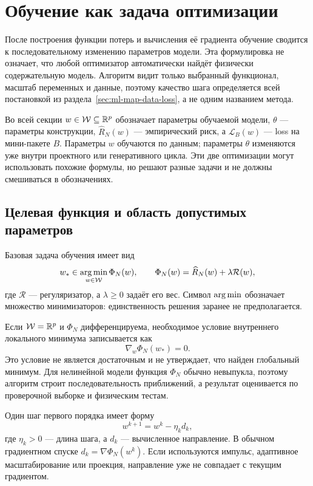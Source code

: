 \section{Обучение как задача оптимизации}
\label{sec:training-as-optimization}
После построения функции потерь и вычисления её градиента обучение сводится к последовательному изменению параметров модели. Эта формулировка не означает, что любой оптимизатор автоматически найдёт физически содержательную модель. Алгоритм видит только выбранный функционал, масштаб переменных и данные, поэтому качество шага определяется всей постановкой из раздела~\ref{sec:ml-map-data-loss}, а не одним названием метода.

Во всей секции $w\in\mathcal W\subseteq\mathbb{R}^p$ обозначает параметры обучаемой модели, $\theta$ --- параметры конструкции, $\widehat R_N(w)$ --- эмпирический риск, а $\mathcal L_B(w)$ --- loss на мини-пакете $B$. Параметры $w$ обучаются по данным; параметры $\theta$ изменяются уже внутри проектного или генеративного цикла. Эти две оптимизации могут использовать похожие формулы, но решают разные задачи и не должны смешиваться в обозначениях.

\subsection{Целевая функция и область допустимых параметров}
Базовая задача обучения имеет вид
\begin{equation}
 w_*
 \in
 \operatorname*{arg\,min}_{w\in\mathcal W}
 \Phi_N(w),
 \qquad
 \Phi_N(w)
 =
 \widehat R_N(w)+\lambda\mathcal R(w),
\end{equation}
где $\mathcal R$ --- регуляризатор, а $\lambda\geq0$ задаёт его вес. Символ $\operatorname*{arg\,min}$ обозначает множество минимизаторов: единственность решения заранее не предполагается.

Если $\mathcal W=\mathbb{R}^p$ и $\Phi_N$ дифференцируема, необходимое условие внутреннего локального минимума записывается как
\begin{equation}
 \nabla_w\Phi_N(w_*)=0.
\end{equation}
Это условие не является достаточным и не утверждает, что найден глобальный минимум. Для нелинейной модели функция $\Phi_N$ обычно невыпукла, поэтому алгоритм строит последовательность приближений, а результат оценивается по проверочной выборке и физическим тестам.

Один шаг первого порядка имеет форму
\begin{equation}
 w^{k+1}
 =
 w^k-\eta_k d_k,
\end{equation}
где $\eta_k>0$ --- длина шага, а $d_k$ --- вычисленное направление. В обычном градиентном спуске $d_k=\nabla\Phi_N(w^k)$. Если используются импульс, адаптивное масштабирование или проекция, направление уже не совпадает с текущим градиентом.

